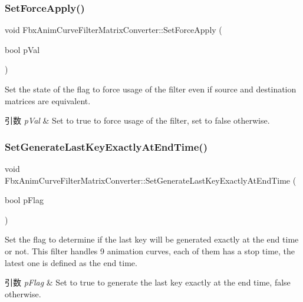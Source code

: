 \subsubsection{\texorpdfstring{Set\+Force\+Apply()}{SetForceApply()}}
{\footnotesize\ttfamily void Fbx\+Anim\+Curve\+Filter\+Matrix\+Converter\+::\+Set\+Force\+Apply (\begin{DoxyParamCaption}\item[{bool}]{p\+Val }\end{DoxyParamCaption})}

Set the state of the flag to force usage of the filter even if source and destination matrices are equivalent. 
\begin{DoxyParams}{引数}
{\em p\+Val} & Set to {\ttfamily true} to force usage of the filter, set to {\ttfamily false} otherwise. \\
\hline
\end{DoxyParams}
\mbox{\label{class_fbx_anim_curve_filter_matrix_converter_a3f6bbf821eff2180bef5b63764d4a305}} 
\subsubsection{\texorpdfstring{Set\+Generate\+Last\+Key\+Exactly\+At\+End\+Time()}{SetGenerateLastKeyExactlyAtEndTime()}}
{\footnotesize\ttfamily void Fbx\+Anim\+Curve\+Filter\+Matrix\+Converter\+::\+Set\+Generate\+Last\+Key\+Exactly\+At\+End\+Time (\begin{DoxyParamCaption}\item[{bool}]{p\+Flag }\end{DoxyParamCaption})}

Set the flag to determine if the last key will be generated exactly at the end time or not. This filter handles 9 animation curves, each of them has a stop time, the latest one is defined as the end time. 
\begin{DoxyParams}{引数}
{\em p\+Flag} & Set to {\ttfamily true} to generate the last key exactly at the end time, {\ttfamily false} otherwise. \\
\hline
\end{DoxyParams}
\mbox{\label{class_fbx_anim_curve_filter_matrix_converter_a3ce7c2108f6a39ad4a13cbc4175a5ec8}} 
